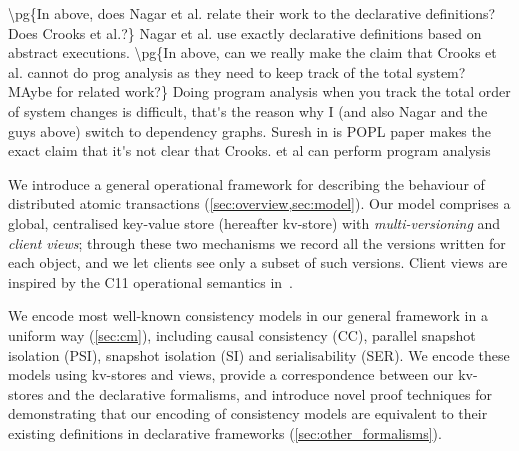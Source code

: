 \ac{
\pg{In above, does Nagar et al.  relate their work to the declarative
  definitions?
Does Crooks et al.?}
Nagar et al. use exactly declarative definitions based on abstract executions.
}
\ac{
\pg{In above, can we really make the claim that Crooks et al. cannot
  do prog analysis as  they need to keep track of the total system?
  MAybe for related work?}
Doing program analysis when you track the total order of system changes 
is difficult, that's the reason why I (and also Nagar and the guys above) switch 
to dependency graphs. Suresh in is POPL paper makes the exact claim that 
it's not clear that Crooks. et al can perform program analysis 
}


We introduce a general operational framework for describing the
behaviour of distributed {atomic} transactions (\cref{sec:overview,sec:model}). 
Our model comprises a global, centralised
key-value store (hereafter kv-store) with {\em multi-versioning} and {\em client views}; 
through these two mechanisms
we record all the versions written for each object, and we let clients see only a subset 
of such versions.
Client views are inspired by the C11 operational semantics in~\cite{promises}.


  We encode most well-known consistency models in our general framework in a uniform way (\cref{sec:cm}), including causal consistency (CC), parallel snapshot isolation
(PSI), snapshot isolation (SI) and serialisability (SER). 
We encode these models using kv-stores and views, 
provide a correspondence between our kv-stores and the declarative formalisms, 
and introduce novel proof techniques for demonstrating that our encoding of consistency models 
are equivalent to their existing definitions in declarative frameworks (\cref{sec:other_formalisms}).
%
%

